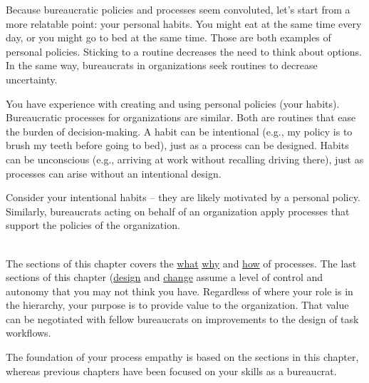 
Because bureaucratic policies and processes seem convoluted, let's start from a more relatable point: your personal habits.
You might eat at the same time every day, or you might go to bed at the same time. Those are both examples of personal policies. Sticking to a routine decreases the need to think about options. In the same way, bureaucrats in organizations seek routines to decrease uncertainty. 

You have experience with creating and using personal policies (your habits).  Bureaucratic processes for organizations are similar.
Both are routines that ease the burden of decision-making. A habit can be intentional (e.g., my policy is to brush my teeth before going to bed), just as a process can be designed. Habits can be unconscious (e.g., arriving at work without recalling driving there), just as processes can arise without an intentional design. 

Consider your intentional habits -- they are likely motivated by a personal policy. Similarly, bureaucrats acting on behalf of an organization apply processes that support the policies of the organization.

\ \\

The sections of this chapter covers 
the \hyperref[sec:definition-of-process]{what}%
\iftoggle{haspagenumbers}{ (page~\pageref{sec:definition-of-process}), }{,}%
\hyperref[sec:why-processes-exist]{why}%
\iftoggle{haspagenumbers}{ (page~\pageref{sec:why-processes-exist}), }{,}%
and 
\hyperref[sec:process-chaos]{how}%
\iftoggle{haspagenumbers}{ (page~\pageref{sec:process-chaos}) }{}%
of processes. 
The last sections of this chapter 
(\hyperref[sec:design-of-processes]{design}%
\iftoggle{haspagenumbers}{ on page~\pageref{sec:design-of-processes} }{}%
and 
\hyperref[sec:change-a-process]{change}%
\iftoggle{haspagenumbers}{ on page~\pageref{sec:change-a-process})}{)}
assume a level of control and autonomy that you may not think you have. Regardless of where your role is in the hierarchy, your purpose is to provide value to the organization. That value can be negotiated with fellow bureaucrats on improvements to the design of task workflows. 

The foundation of your \gls{process empathy} is based on the sections in this chapter, whereas previous chapters have been focused on your skills as a bureaucrat. 
